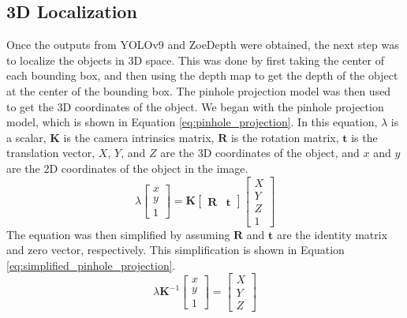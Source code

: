 \subsection{3D Localization}
Once the outputs from YOLOv9 and ZoeDepth were obtained, the next step was to localize the objects in 3D space. This was done by first taking the center of each bounding box, and then using the depth map to get the depth of the object at the center of the bounding box. The pinhole projection model was then used to get the 3D coordinates of the object.
We began with the pinhole projection model, which is shown in Equation \ref{eq:pinhole_projection}. In this equation, $\lambda$ is a scalar, $\mathbf{K}$ is the camera intrinsics matrix, $\mathbf{R}$ is the rotation matrix, $\mathbf{t}$ is the translation vector, $X$, $Y$, and $Z$ are the 3D coordinates of the object, and $x$ and $y$ are the 2D coordinates of the object in the image.
\begin{equation}\label{eq:pinhole_projection}
    \lambda\begin{bmatrix}
        x \\
        y \\
        1
    \end{bmatrix}
    =
    \mathbf{K}
    \begin{bmatrix}
        \mathbf{R} & \mathbf{t}
    \end{bmatrix}
    \begin{bmatrix}
        X \\
        Y \\
        Z \\
        1
    \end{bmatrix}
\end{equation}
The equation was then simplified by assuming $\mathbf{R}$ and $\mathbf{t}$ are the identity matrix and zero vector, respectively. This simplification is shown in Equation \ref{eq:simplified_pinhole_projection}.
\begin{equation}\label{eq:simplified_pinhole_projection}
    \lambda \mathbf{K}^{-1}\begin{bmatrix}
        x \\
        y \\
        1
    \end{bmatrix}
    =
    \begin{bmatrix}
        X \\
        Y \\
        Z
    \end{bmatrix}
\end{equation}

